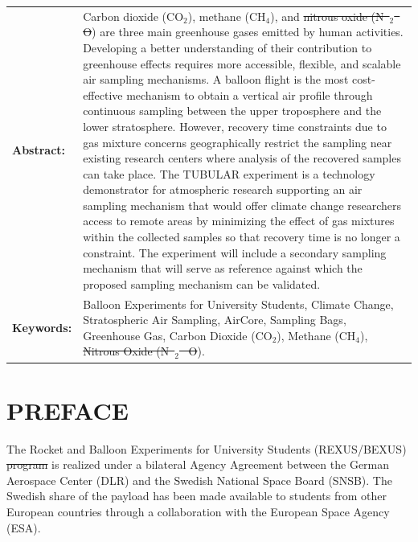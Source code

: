 \documentclass[a4paper,12pt,twoside]{article}
\providecommand{\DIFaddtex}[1]{{\protect\color{blue}\uwave{#1}}} %
\providecommand{\DIFdeltex}[1]{{\protect\color{red}\sout{#1}}}                      %
\providecommand{\DIFaddbegin}{} %
\providecommand{\DIFaddend}{} %
\providecommand{\DIFdelbegin}{} %
\providecommand{\DIFdelend}{} %
\providecommand{\DIFadd}[1]{\texorpdfstring{\DIFaddtex{#1}}{#1}} %
\providecommand{\DIFdel}[1]{\texorpdfstring{\DIFdeltex{#1}}{}} %
\newcommand{\DIFscaledelfig}{0.5}
\newlength{\DIFdelgraphicswidth} %
\newlength{\DIFdelgraphicsheight} %
\newcommand{\DIFaddincludegraphics}[2][]{{\color{blue}\fbox{\DIFOincludegraphics[#1]{#2}}}} %
\newcommand{\DIFdelincludegraphics}[2][]{%
\sbox{\DIFdelgraphicsbox}{\DIFOincludegraphics[#1]{#2}}%
\settoboxwidth{\DIFdelgraphicswidth}{\DIFdelgraphicsbox} %
\settoboxtotalheight{\DIFdelgraphicsheight}{\DIFdelgraphicsbox} %
\scalebox{\DIFscaledelfig}{%
\parbox[b]{\DIFdelgraphicswidth}{\usebox{\DIFdelgraphicsbox}\\[-\baselineskip] \rule{\DIFdelgraphicswidth}{0em}}\llap{\resizebox{\DIFdelgraphicswidth}{\DIFdelgraphicsheight}{%
\setlength{\unitlength}{\DIFdelgraphicswidth}%
\begin{picture}(1,1)%
\thicklines\linethickness{2pt} %
{\color[rgb]{1,0,0}\put(0,0){\framebox(1,1){}}}%
{\color[rgb]{1,0,0}\put(0,0){\line( 1,1){1}}}%
{\color[rgb]{1,0,0}\put(0,1){\line(1,-1){1}}}%
\end{picture}%
}\hspace*{3pt}}} %
} %
\DeclareRobustCommand{\DIFaddbegin}{\DIFOaddbegin \let\includegraphics\DIFaddincludegraphics} %
\DeclareRobustCommand{\DIFaddend}{\DIFOaddend \let\includegraphics\DIFOincludegraphics} %
\DeclareRobustCommand{\DIFdelbegin}{\DIFOdelbegin \let\includegraphics\DIFdelincludegraphics} %
\DeclareRobustCommand{\DIFdelend}{\DIFOaddend \let\includegraphics\DIFOincludegraphics} %
\begin{document}
\vspace{1cm}
\begin{tabular}{p{} p{}}
\textbf{Abstract:}     &  %
Carbon dioxide (CO$_{2}$), methane (CH$_{4}$), and \DIFdelbegin \DIFdel{nitrous oxide (N\mbox{%
$_2$
}%
O}\DIFdelend \DIFaddbegin \DIFadd{carbon monoxide (CO}\DIFaddend ) are three main greenhouse gases emitted by human activities. Developing a better understanding of their contribution to greenhouse effects requires more accessible, flexible, and scalable air sampling mechanisms. A balloon flight is the most cost-effective mechanism to obtain a vertical air profile through continuous sampling between the upper troposphere and the lower stratosphere. However, recovery time constraints due to gas mixture concerns geographically restrict the sampling near existing research centers where analysis of the recovered samples can take place. The TUBULAR experiment is a technology demonstrator for atmospheric research supporting an air sampling mechanism that would offer climate change researchers access to remote areas by minimizing the effect of gas mixtures within the collected samples so that recovery time is no longer a constraint. The experiment will include a secondary sampling mechanism that will serve as reference against which the proposed sampling mechanism can be validated.  &  \\
\textbf{Keywords:}     & %
Balloon Experiments for University Students, Climate Change, Stratospheric Air Sampling, AirCore, Sampling Bags, Greenhouse Gas, Carbon Dioxide (CO$_{2}$), Methane (CH$_{4}$), \DIFdelbegin \DIFdel{Nitrous Oxide (N\mbox{%
$_{2}$
}%
O}\DIFdelend \DIFaddbegin \DIFadd{Carbon Monoxide (CO}\DIFaddend ).
\end{tabular}

\vfill

\newpage
\tableofcontents

\newpage
\section*{PREFACE} \markboth{}{}

The Rocket and Balloon Experiments for University Students (REXUS/BEXUS) \DIFdelbegin \DIFdel{program }\DIFdelend \DIFaddbegin \DIFadd{programme }\DIFaddend is realized under a bilateral Agency Agreement between the German Aerospace Center (DLR) and the Swedish National Space Board (SNSB). The Swedish share of the
payload has been made available to students from other European countries through a collaboration with the European Space Agency (ESA).
\end{document}
